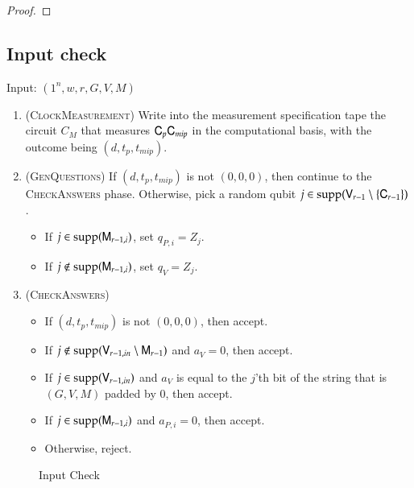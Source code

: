 \begin{proof}
\end{proof}


\subsection{Input check}
\label{sec:input_check}


\vspace{10pt}
\begin{center}
\begin{mdframed}
    Input: $(1^n,w,r,G,V,M)$
    
	\begin{enumerate}
		\item (\textsc{ClockMeasurement}) Write into the measurement specification tape the circuit $C_M$ that measures ${\mathsf{C}}_p {\mathsf{C}}_{mip}$ in the computational basis, with the outcome being $(d,t_p,t_{mip})$.
		\item (\textsc{GenQuestions}) If $(d,t_p,t_{mip})$ is not $(0,0,0)$, then continue to the \textsc{CheckAnswers} phase. Otherwise, pick a random qubit $j \in \operatorname{supp}({\mathsf{V}}_{r-1} \setminus \{{\mathsf{C}}_{r-1} \})$. 
		\begin{itemize}
			\item If $j \in \operatorname{supp}({\mathsf{M}}_{r-1,i})$, set $q_{P,i} = Z_j$.
			\item If $j \notin \operatorname{supp}({\mathsf{M}}_{r-1,i})$, set $q_V = Z_j$.
		\end{itemize}
		
		\item (\textsc{CheckAnswers}) 
		\begin{itemize}
			\item If $(d,t_p,t_{mip})$ is not $(0,0,0)$, then accept. 
			\item If $j \notin \operatorname{supp}({\mathsf{V}}_{r-1,in} \setminus {\mathsf{M}}_{r-1})$ and $a_V = 0$, then accept. 
			\item If $j \in \operatorname{supp}({\mathsf{V}}_{r-1,in})$ and $a_V$ is equal to the $j$'th bit of the string that is $(G,V,M)$ padded by $0$, then accept. 
			\item If $j \in \operatorname{supp}({\mathsf{M}}_{r-1,i})$ and $a_{P,i} = 0$, then accept.
			\item Otherwise, reject.
		\end{itemize}
	\end{enumerate}    
\end{mdframed}
\end{center}
\begin{figure}[H]
\caption{Input Check}
\label{fig:input_check}
\end{figure}

